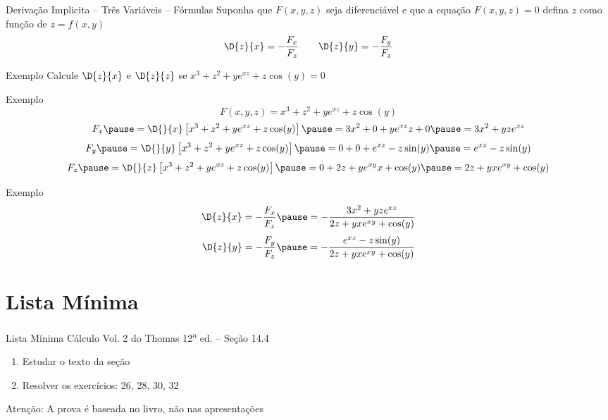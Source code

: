 \begin{frame}{Derivação Implicita -- Três Variáveis -- Fórmulas}
  Suponha que $F(x, y, z)$ seja diferenciável e que a equação $F(x, y, z)=0$
  defina $z$ como função de $z=f(x, y)$
  \[
    \D{z}{x} = -\frac{F_x}{F_z} \qquad
    \D{z}{y} = -\frac{F_y}{F_z}
  \]
\end{frame}

\addtocounter{exemplo}{1}
\begin{frame}{Exemplo \theexemplo}
  Calcule \(\D{z}{x}\) e \(\D{z}{z}\) se \(x^3 + z^2 + ye^{xz} + z\cos(y) = 0\)
\end{frame}

\begin{frame}{Exemplo \theexemplo}
  \[
    F(x, y, z) = x^3 + z^2 + ye^{xz} + z\cos(y)
  \]
  \pause
  \[
    F_x
    \pause
    = \D{}{x}\left[x^3 + z^2 + ye^{xz} + z\cos(y)\right]
    \pause
    = 3x^2 + 0 + ye^{xz}z + 0
    \pause
    = 3x^2 + yze^{xz}
  \]
  \pause
  \[
    F_y
    \pause
    = \D{}{y}\left[x^3 + z^2 + ye^{xz} + z\cos(y)\right]
    \pause
    = 0 + 0 + e^{xz} -z\sin(y)
    \pause
    = e^{xz} -z\sin(y)
  \]
  \pause
  \[
    F_z
    \pause
    = \D{}{z}\left[x^3 + z^2 + ye^{xz} + z\cos(y)\right]
    \pause
    = 0 + 2z + ye^{xy}x + \cos(y)
    \pause
    = 2z + yxe^{xy} + \cos(y)
  \]
\end{frame}

\begin{frame}{Exemplo \theexemplo}
  \[
    \D{z}{x}
    = -\frac{F_x}{F_z}
    \pause
    = -\frac{3x^2 + yze^{xz}}{2z + yxe^{xy} + \cos(y)}
  \]
  \pause
  \[
    \D{z}{y}
    = -\frac{F_y}{F_z}
    \pause
    = -\frac{e^{xz} -z\sin(y)}{2z + yxe^{xy} + \cos(y)}
  \]
\end{frame}

\section{Lista Mínima}

\begin{frame}{Lista Mínima}
  Cálculo Vol. 2 do Thomas 12\textsuperscript{a} ed. -- Seção 14.4
  \begin{enumerate}
    \item Estudar o texto da seção
    \item Resolver os exercícios: 26, 28, 30, 32
  \end{enumerate}

  \vfill
  Atenção: A prova é baseada no livro, não nas apresentações
\end{frame}


